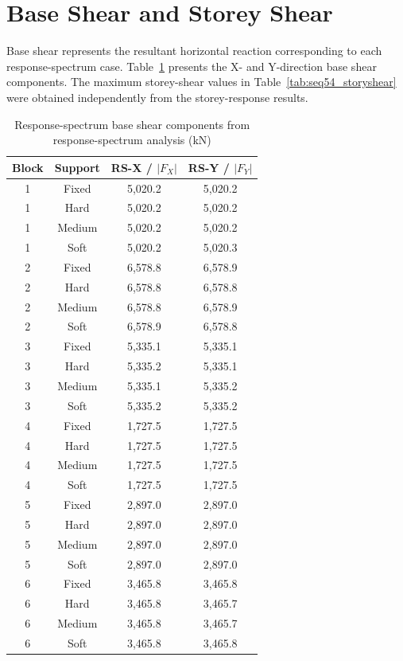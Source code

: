 \section{Base Shear and Storey Shear}

Base shear represents the resultant horizontal reaction corresponding to each response-spectrum case. Table~\ref{tab:seq54_baseshear} presents the X- and Y-direction base shear components. The maximum storey-shear values in Table~\ref{tab:seq54_storyshear} were obtained independently from the storey-response results.

\begin{table}[!htbp]
\fontsize{11}{13}\selectfont\setlength{\tabcolsep}{4pt}
\centering
\fontsize{11}{13}\selectfont\setlength{\tabcolsep}{4pt}\renewcommand{\arraystretch}{0.95}
\caption{Response-spectrum base shear components from response-spectrum analysis (kN)}\label{tab:seq54_baseshear}
\begin{tabular*}{\linewidth}{@{\extracolsep{\fill}}cccc@{}}
\toprule
Block & Support & RS-X / $|F_X|$ & RS-Y / $|F_Y|$\\
\midrule
1 & Fixed & 5,020.2 & 5,020.2 \\
1 & Hard & 5,020.2 & 5,020.2 \\
1 & Medium & 5,020.2 & 5,020.2 \\
1 & Soft & 5,020.2 & 5,020.3 \\
2 & Fixed & 6,578.8 & 6,578.9 \\
2 & Hard & 6,578.8 & 6,578.8 \\
2 & Medium & 6,578.8 & 6,578.9 \\
2 & Soft & 6,578.9 & 6,578.8 \\
3 & Fixed & 5,335.1 & 5,335.1 \\
3 & Hard & 5,335.2 & 5,335.1 \\
3 & Medium & 5,335.1 & 5,335.2 \\
3 & Soft & 5,335.2 & 5,335.2 \\
4 & Fixed & 1,727.5 & 1,727.5 \\
4 & Hard & 1,727.5 & 1,727.5 \\
4 & Medium & 1,727.5 & 1,727.5 \\
4 & Soft & 1,727.5 & 1,727.5 \\
5 & Fixed & 2,897.0 & 2,897.0 \\
5 & Hard & 2,897.0 & 2,897.0 \\
5 & Medium & 2,897.0 & 2,897.0 \\
5 & Soft & 2,897.0 & 2,897.0 \\
6 & Fixed & 3,465.8 & 3,465.8 \\
6 & Hard & 3,465.8 & 3,465.7 \\
6 & Medium & 3,465.8 & 3,465.7 \\
6 & Soft & 3,465.8 & 3,465.8 \\
\bottomrule
\end{tabular*}
\end{table}

